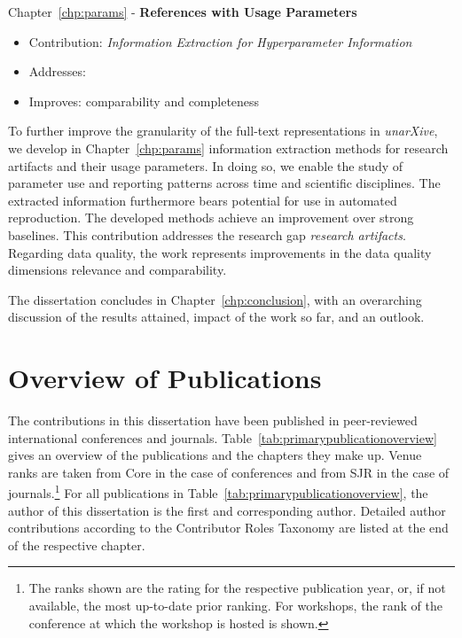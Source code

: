 Chapter~\ref{chp:params} - \textbf{References with Usage Parameters}
\begin{itemize}
    \setlength\itemsep{-0.5em}
    \item Contribution: \textit{Information Extraction for Hyperparameter Information}
    \item Addresses: 
    \item Improves: comparability and completeness
\end{itemize}
To further improve the granularity of the full-text representations in \emph{unarXive}, we develop in Chapter~\ref{chp:params} information extraction methods for research artifacts and their usage parameters. In doing so, we enable the study of parameter use and reporting patterns across time and scientific disciplines. The extracted information furthermore bears potential for use in automated reproduction. The developed methods achieve an improvement over strong baselines.
This contribution addresses the research gap \emph{research artifacts}.
Regarding data quality, the work represents improvements %
in the data quality dimensions relevance and comparability.

The dissertation concludes in Chapter~\ref{chp:conclusion}, with an overarching discussion of the results attained, impact of the work so far, and an outlook.

\section{Overview of Publications}\label{sec:intro-puboverview}

The contributions in this dissertation have been published in peer-reviewed international conferences and journals. Table~\ref{tab:primarypublicationoverview} gives an overview of the publications and the chapters they make up. Venue ranks are taken from Core in the case of conferences and from SJR in the case of journals.\footnote{The ranks shown are the rating for the respective publication year, or, if not available, the most up-to-date prior ranking. For workshops, the rank of the conference at which the workshop is hosted is shown.} For all publications in Table~\ref{tab:primarypublicationoverview}, the author of this dissertation is the first and corresponding author. Detailed author contributions according to the Contributor Roles Taxonomy are listed at the end of the respective chapter.

